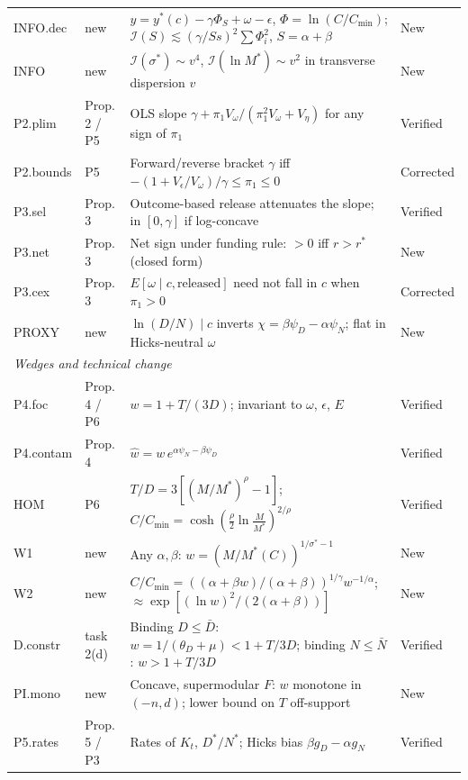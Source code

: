 \begin{table}[htbp]
\begin{threeparttable}
\begin{tabular}{@{}l p{} p{} p{}@{}}
INFO.dec & \raggedright new & \raggedright $y=y^*(c)-\gamma\Phi_S+\omega-\epsilon$, $\Phi=\ln(C/C_{\min})$; $\mathcal I(S)\lesssim(\gamma/Ss)^2\sum\Phi_i^2$, $S=\alpha+\beta$ & \raggedright New \tabularnewline
INFO & \raggedright new & \raggedright $\mathcal I(\sigma^*)\sim v^4$, $\mathcal I(\ln M^*)\sim v^2$ in transverse dispersion $v$ & \raggedright New \tabularnewline
P2.plim & \raggedright Prop. 2 / P5 & \raggedright OLS slope $\gamma+\pi_1V_\omega/(\pi_1^2V_\omega+V_\eta)$ for any sign of $\pi_1$ & \raggedright Verified \tabularnewline
P2.bounds & \raggedright P5 & \raggedright Forward/reverse bracket $\gamma$ iff $-(1+V_\epsilon/V_\omega)/\gamma\le\pi_1\le0$ & \raggedright Corrected \tabularnewline
P3.sel & \raggedright Prop. 3 & \raggedright Outcome-based release attenuates the slope; in $[0,\gamma]$ if log-concave & \raggedright Verified \tabularnewline
P3.net & \raggedright Prop. 3 & \raggedright Net sign under funding rule: $>0$ iff $r>r^*$ (closed form) & \raggedright New \tabularnewline
P3.cex & \raggedright Prop. 3 & \raggedright $E[\omega\mid c,\text{released}]$ need not fall in $c$ when $\pi_1>0$ & \raggedright Corrected \tabularnewline
PROXY & \raggedright new & \raggedright $\ln(D/N)\mid c$ inverts $\chi=\beta\psi_D-\alpha\psi_N$; flat in Hicks-neutral $\omega$ & \raggedright New \tabularnewline
\multicolumn{4}{l}{\textit{Wedges and technical change}} \\
P4.foc & \raggedright Prop. 4 / P6 & \raggedright $w=1+T/(3D)$; invariant to $\omega$, $\epsilon$, $E$ & \raggedright Verified \tabularnewline
P4.contam & \raggedright Prop. 4 & \raggedright $\hat w=w\,e^{\alpha\psi_N-\beta\psi_D}$ & \raggedright Verified \tabularnewline
HOM & \raggedright P6 & \raggedright $T/D=3[(M/M^*)^\rho-1]$; $C/C_{\min}=\cosh(\tfrac{\rho}{2}\ln\tfrac{M}{M^*})^{2/\rho}$ & \raggedright Verified \tabularnewline
W1 & \raggedright new & \raggedright Any $\alpha,\beta$: $w=(M/M^*(C))^{1/\sigma^*-1}$ & \raggedright New \tabularnewline
W2 & \raggedright new & \raggedright $C/C_{\min}=((\alpha+\beta w)/(\alpha+\beta))^{1/\gamma}w^{-1/\alpha}$; $\approx\exp[(\ln w)^2/(2(\alpha+\beta))]$ & \raggedright New \tabularnewline
D.constr & \raggedright task 2(d) & \raggedright Binding $D\le\bar D$: $w=1/(\theta_D+\mu)<1+T/3D$; binding $N\le\bar N$: $w>1+T/3D$ & \raggedright Verified \tabularnewline
PI.mono & \raggedright new & \raggedright Concave, supermodular $F$: $w$ monotone in $(-n,d)$; lower bound on $T$ off-support & \raggedright New \tabularnewline
P5.rates & \raggedright Prop. 5 / P3 & \raggedright Rates of $K_t$, $D^*/N^*$; Hicks bias $\beta g_D-\alpha g_N$ & \raggedright Verified \tabularnewline

\end{tabular}
\end{threeparttable}
\end{table}

